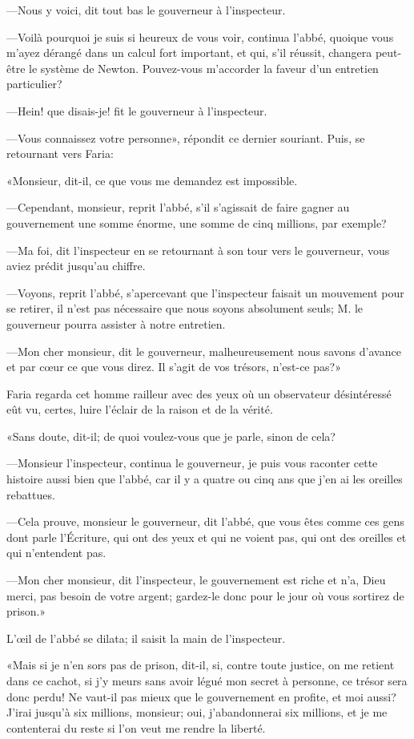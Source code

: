 —Nous y voici, dit tout bas le gouverneur à l'inspecteur.

—Voilà pourquoi je suis si heureux de vous voir, continua l'abbé, quoique vous m'ayez dérangé dans un calcul fort important, et qui, s'il réussit, changera peut-être le système de Newton. Pouvez-vous m'accorder la faveur d'un entretien particulier?

—Hein! que disais-je! fit le gouverneur à l'inspecteur.

—Vous connaissez votre personne», répondit ce dernier souriant. Puis, se retournant vers Faria:

«Monsieur, dit-il, ce que vous me demandez est impossible.

—Cependant, monsieur, reprit l'abbé, s'il s'agissait de faire gagner au gouvernement une somme énorme, une somme de cinq millions, par exemple?

—Ma foi, dit l'inspecteur en se retournant à son tour vers le gouverneur, vous aviez prédit jusqu'au chiffre.

—Voyons, reprit l'abbé, s'apercevant que l'inspecteur faisait un mouvement pour se retirer, il n'est pas nécessaire que nous soyons absolument seuls; M. le gouverneur pourra assister à notre entretien.

—Mon cher monsieur, dit le gouverneur, malheureusement nous savons d'avance et par cœur ce que vous direz. Il s'agit de vos trésors, n'est-ce pas?»

Faria regarda cet homme railleur avec des yeux où un observateur désintéressé eût vu, certes, luire l'éclair de la raison et de la vérité.

«Sans doute, dit-il; de quoi voulez-vous que je parle, sinon de cela?

—Monsieur l'inspecteur, continua le gouverneur, je puis vous raconter cette histoire aussi bien que l'abbé, car il y a quatre ou cinq ans que j'en ai les oreilles rebattues.

—Cela prouve, monsieur le gouverneur, dit l'abbé, que vous êtes comme ces gens dont parle l'Écriture, qui ont des yeux et qui ne voient pas, qui ont des oreilles et qui n'entendent pas.

—Mon cher monsieur, dit l'inspecteur, le gouvernement est riche et n'a, Dieu merci, pas besoin de votre argent; gardez-le donc pour le jour où vous sortirez de prison.»

L'œil de l'abbé se dilata; il saisit la main de l'inspecteur.

«Mais si je n'en sors pas de prison, dit-il, si, contre toute justice, on me retient dans ce cachot, si j'y meurs sans avoir légué mon secret à personne, ce trésor sera donc perdu! Ne vaut-il pas mieux que le gouvernement en profite, et moi aussi? J'irai jusqu'à six millions, monsieur; oui, j'abandonnerai six millions, et je me contenterai du reste si l'on veut me rendre la liberté.

